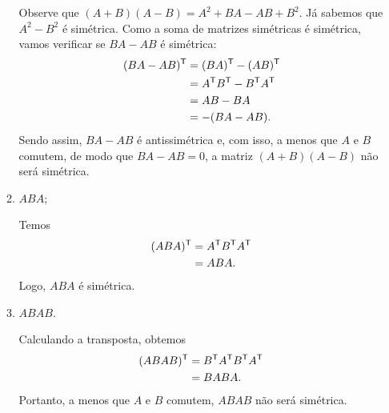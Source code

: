 \documentclass[leqno]{article}
\numberwithin{equation}{section}
\begin{document}
\begin{enumerate}
\begin{enumerate}
                        \begin{sol} 
                            Observe que \( ( A + B )( A - B ) = A^2 + BA - AB + B^2 \).
                            Já sabemos que \( A^2 - B^2 \) é simétrica.
                            Como a soma de matrizes simétricas é simétrica, vamos verificar se \( BA - AB \) é simétrica:
                            \begin{align*}
                                ( BA - AB )^{ \mathsf{T} }
                                &= ( BA )^{ \mathsf{T} } - ( AB )^{ \mathsf{T} } \\
                                &= A^{ \mathsf{T} } B^{ \mathsf{T} }
                                - B^{ \mathsf{T} } A^{ \mathsf{T} } \\
                                &= AB - BA \\
                                &= - ( BA - AB )
                            .\end{align*}
                            Sendo assim, \( BA - AB \) é antissimétrica e, com isso, a menos que \( A \) e \( B \) comutem, de modo que \( BA - AB = 0 \), a matriz \( ( A + B )( A - B ) \) não será simétrica.
                        \end{sol} 

                    \item $ABA$;

                        \begin{sol} 
                            Temos
                            \begin{align*}
                                ( ABA )^{ \mathsf{T} }
                                &= A^{ \mathsf{T} } B^{ \mathsf{T} } A^{ \mathsf{T} } \\
                                &= ABA
                            .\end{align*}
                            Logo, \( ABA \) é simétrica.
                        \end{sol} 

                    \item $ABAB$.

                        \begin{sol} 
                            Calculando a transposta, obtemos
                            \begin{align*}
                                ( ABAB )^{ \mathsf{T} }
                                &= B^{ \mathsf{T} } A^{ \mathsf{T} } B^{ \mathsf{T} } A^{ \mathsf{T} } \\
                                &= BABA
                            .\end{align*}
                            Portanto, a menos que \( A \) e \( B \) comutem, \( ABAB \) não será simétrica.
                        \end{sol} 


\end{enumerate}
\end{enumerate}
\end{document}
